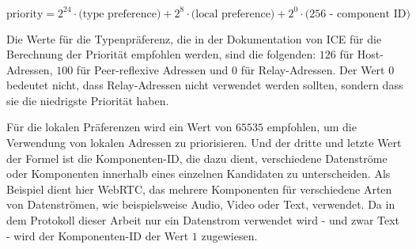 \begin{equation}
    \label{eq:ice_priority}
    \text{priority} = \text{2}^{24} \cdot \text{(type preference)} + \text{2}^{8} \cdot \text{(local preference)} + \text{2}^{0} \cdot \text{(256 - component ID)}
\end{equation}

\noindent Die Werte für die Typenpräferenz, die in der Dokumentation von ICE für die Berechnung der Priorität empfohlen werden, sind die folgenden: $126$ für Host-Adressen, $100$ für Peer-reflexive Adressen und $0$ für Relay-Adressen. Der Wert $0$ bedeutet nicht, dass Relay-Adressen nicht verwendet werden sollten, sondern dass sie die niedrigste Priorität haben. 

Für die lokalen Präferenzen wird ein Wert von $65535$ empfohlen, um die Verwendung von lokalen Adressen zu priorisieren. Und der dritte und letzte Wert der Formel ist die Komponenten-ID, die dazu dient, verschiedene Datenströme oder Komponenten innerhalb eines einzelnen Kandidaten zu unterscheiden. Als Beispiel dient hier WebRTC, das mehrere Komponenten für verschiedene Arten von Datenströmen, wie beispielsweise Audio, Video oder Text, verwendet. Da in dem Protokoll dieser Arbeit nur ein Datenstrom verwendet wird - und zwar Text - wird der Komponenten-ID der Wert $1$ zugewiesen.

